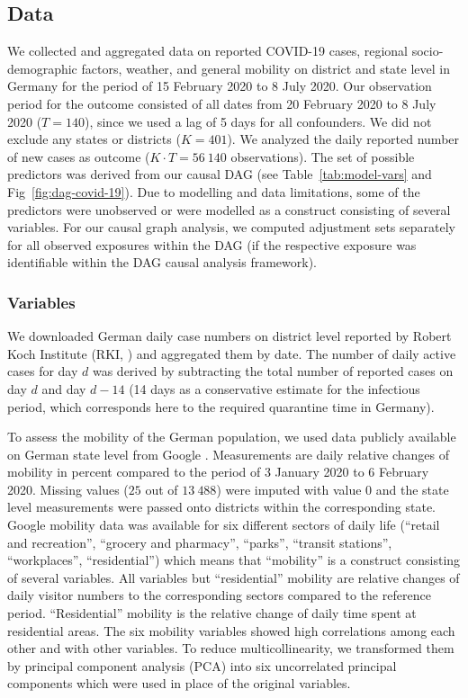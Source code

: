 \documentclass[10pt,letterpaper]{article}
\begin{document}
\subsection*{Data}\label{data}

We collected and aggregated data on reported COVID-19 cases, regional
socio-demographic factors, weather, and general mobility on district and
state level in Germany for the period of 15 February 2020 to 8 July
2020. Our observation period for the outcome consisted of all dates from
20 February 2020 to 8 July 2020 (\(T=140\)), since we used a lag of 5
days for all confounders. We did not exclude any states or districts
(\(K=401\)). We analyzed the daily reported number of new cases as
outcome (\(K\cdot T=56{\ }140\) observations). The set of possible
predictors was derived from our causal DAG (see Table~\ref{tab:model-vars} and Fig~\ref{fig:dag-covid-19}). Due to
modelling and data limitations, some of the predictors were unobserved
or were modelled as a construct consisting of several variables. For our causal graph analysis, we computed adjustment sets separately for all observed exposures within the DAG (if the respective exposure was identifiable within the DAG causal analysis framework).

\subsubsection*{Variables}\label{variables}

We downloaded German daily case numbers on district level reported by
Robert Koch Institute (RKI, \cite{casenumbers_rki}) and aggregated them by date. The number of daily active cases for
day \(d\) was derived by subtracting the total number of reported cases
on day \(d\) and day \(d-14\) (14 days as a conservative estimate for
the infectious period, which corresponds here to the required quarantine
time in Germany).

To assess the mobility of the German population, we used data publicly
available on German state level from Google \cite{google_mobility}.
Measurements are daily relative changes of mobility in percent compared
to the period of 3 January 2020 to 6 February 2020. Missing values
(\(25\) out of \(13{\ }488\)) were imputed with value \(0\) and the
state level measurements were passed onto districts within the
corresponding state. Google mobility data was available for six
different sectors of daily life (``retail and recreation'', ``grocery
and pharmacy'', ``parks'', ``transit stations'', ``workplaces'',
``residential'') which means that ``mobility'' is a construct consisting
of several variables. All variables but ``residential'' mobility are
relative changes of daily visitor numbers to the corresponding sectors
compared to the reference period. ``Residential'' mobility is the
relative change of daily time spent at residential areas. The six mobility variables showed high correlations among each other and with other variables. To reduce multicollinearity, we transformed them by principal component analysis (PCA) into six uncorrelated principal components which were used in place of the original variables.
\end{document}
